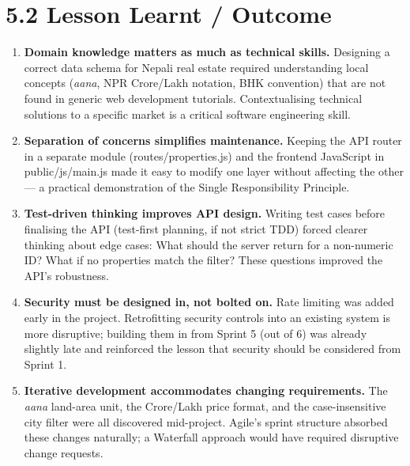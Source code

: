 \documentclass[12pt,a4paper]{report}
\begin{document}
\section{5.2 Lesson Learnt / Outcome}
\begin{enumerate}
  \item \textbf{Domain knowledge matters as much as technical skills.} Designing a correct data schema for Nepali real estate required understanding local concepts (\textit{aana}, NPR Crore/Lakh notation, BHK convention) that are not found in generic web development tutorials. Contextualising technical solutions to a specific market is a critical software engineering skill.
  \item \textbf{Separation of concerns simplifies maintenance.} Keeping the API router in a separate module (routes/properties.js) and the frontend JavaScript in public/js/main.js made it easy to modify one layer without affecting the other --- a practical demonstration of the Single Responsibility Principle.
  \item \textbf{Test-driven thinking improves API design.} Writing test cases before finalising the API (test-first planning, if not strict TDD) forced clearer thinking about edge cases: What should the server return for a non-numeric ID? What if no properties match the filter? These questions improved the API's robustness.
  \item \textbf{Security must be designed in, not bolted on.} Rate limiting was added early in the project. Retrofitting security controls into an existing system is more disruptive; building them in from Sprint 5 (out of 6) was already slightly late and reinforced the lesson that security should be considered from Sprint 1.
  \item \textbf{Iterative development accommodates changing requirements.} The \textit{aana} land-area unit, the Crore/Lakh price format, and the case-insensitive city filter were all discovered mid-project. Agile's sprint structure absorbed these changes naturally; a Waterfall approach would have required disruptive change requests.
\end{enumerate}
\end{document}
